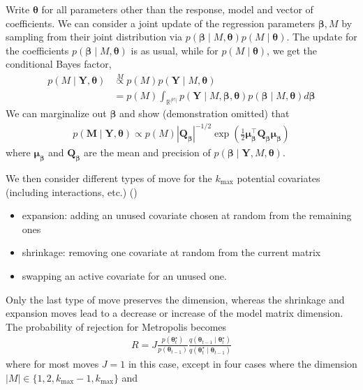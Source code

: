 \documentclass[
  11pt,
  letterpaper,
]{scrbook}
\providecommand{\tightlist}{%
  \setlength{\itemsep}{0pt}\setlength{\parskip}{0pt}}\usepackage{longtable,booktabs,array}
\theoremstyle{definition}
\theoremstyle{definition}
\theoremstyle{definition}
\theoremstyle{plain}
\theoremstyle{plain}
\theoremstyle{plain}
\theoremstyle{remark}
\begin{document}
Write \(\boldsymbol{\theta}\) for all parameters other than the
response, model and vector of coefficients. We can consider a joint
update of the regression parameters \(\boldsymbol{\beta}, M\) by
sampling from their joint distribution via
\(p(\boldsymbol{\beta} \mid M, \boldsymbol{\theta}) p(M \mid \boldsymbol{\theta}).\)
The update for the coefficients
\(p(\boldsymbol{\beta} \mid M, \boldsymbol{\theta})\) is as usual, while
for \(p(M \mid \boldsymbol{\theta})\), we get the conditional Bayes
factor, \begin{align*}
 p(M \mid \boldsymbol{Y}, \boldsymbol{\theta}) &\stackrel{M}{\propto} p(M) p(\boldsymbol{Y} \mid M, \boldsymbol{\theta})
 \\&= p(M) \int_{\mathbb{R}^{\mathbb{|M|}}}p(\boldsymbol{Y} \mid M, \boldsymbol{\beta},\boldsymbol{\theta}) p(\boldsymbol{\beta} \mid M, \boldsymbol{\theta}) d \boldsymbol{\beta}
\end{align*} We can marginalize out \(\boldsymbol{\beta}\) and show
(demonstration omitted) that \begin{align*}
p(\boldsymbol{M} \mid \boldsymbol{Y}, \boldsymbol{\theta}) \propto p(M) |\boldsymbol{Q}_{\boldsymbol{\beta}}|^{-1/2}\exp\left( \frac{1}{2} \boldsymbol{\mu}_{\boldsymbol{\beta}}^\top\boldsymbol{Q}_{\boldsymbol{\beta}} \boldsymbol{\mu}_{\boldsymbol{\beta}}\right)
\end{align*} where \(\boldsymbol{\mu}_{\boldsymbol{\beta}}\) and
\(\boldsymbol{Q}_{\boldsymbol{\beta}}\) are the mean and precision of
\(p(\boldsymbol{\beta} \mid \boldsymbol{Y}, M, \boldsymbol{\theta}).\)

We then consider different types of move for the \(k_{\max}\) potential
covariates (including interactions, etc.)
()

\begin{itemize}
\tightlist
\item
  expansion: adding an unused covariate chosen at random from the
  remaining ones
\item
  shrinkage: removing one covariate at random from the current matrix
\item
  swapping an active covariate for an unused one.
\end{itemize}

Only the last type of move preserves the dimension, whereas the
shrinkage and expansion moves lead to a decrease or increase of the
model matrix dimension. The probability of rejection for Metropolis
becomes \begin{align*}
R = J\frac{p(\boldsymbol{\theta}_t^{\star})}{p(\boldsymbol{\theta}_{t-1})}\frac{q(\boldsymbol{\theta}_{t-1} \mid \boldsymbol{\theta}_t^{\star} )}{q(\boldsymbol{\theta}_t^{\star} \mid \boldsymbol{\theta}_{t-1})}
\end{align*} where for most moves \(J=1\) in this case, except in four
cases where the dimension \(|M| \in\{1, 2, k_{\max}-1, k_{\max}\}\) and
\end{document}
